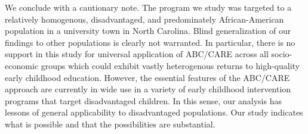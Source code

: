 We conclude with a cautionary note. The program we study was targeted to a relatively homogenous, disadvantaged, and predominately African-American population in a university town in North Carolina. Blind generalization of our findings to other populations is clearly not warranted. In particular, there is no support in this study for universal application of ABC/CARE across all socio-economic groups which could exhibit vastly heterogenous returns to high-quality early childhood education. However, the essential features of the ABC/CARE approach are currently in wide use in a variety of early childhood intervention programs that target disadvantaged children. In this sense, our analysis has lessons of general applicability to disadvantaged populations. Our study indicates what is possible and that the possibilities are substantial.

\singlespace





